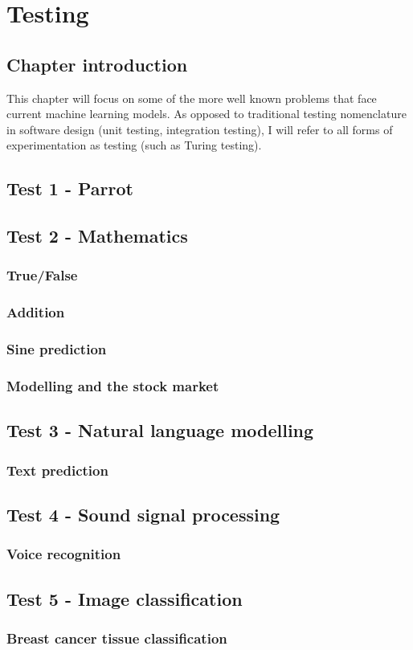 \chapter{Testing}
\section{Chapter introduction}
This chapter will focus on some of the more well known problems that face current machine learning models. 
As opposed to traditional testing nomenclature in software design (unit testing, integration testing), I will refer to all forms of experimentation as testing (such as Turing testing).
\section{Test 1 - Parrot}
\section{Test 2 - Mathematics}
\subsection{True/False}
\subsection{Addition}
\subsection{Sine prediction}
\subsection{Modelling and the stock market}
\section{Test 3 - Natural language modelling}
\subsection{Text prediction}
\section{Test 4 - Sound signal processing}
\subsection{Voice recognition}
\section{Test 5 - Image classification}
\subsection{Breast cancer tissue classification}
